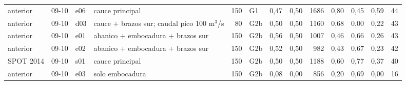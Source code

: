 {\begin{longtable}{lll>{\raggedright\arraybackslash}p{3.3cm}rlrrrrrrr}
anterior & 09-10 & e06 & cauce principal & 150 & G1 & 0{,}47 & 0{,}50 & 1686 & 0{,}80 & 0{,}45 & 0{,}59 & 44\\
anterior & 09-10 & d03 & cauce + brazos sur; caudal pico 100 m$^3$/s & 80 & G2b & 0{,}50 & 0{,}50 & 1160 & 0{,}68 & 0{,}00 & 0{,}22 & 43\\
anterior & 09-10 & e01 & abanico + embocadura + brazos sur & 150 & G2b & 0{,}56 & 0{,}50 & 1007 & 0{,}46 & 0{,}66 & 0{,}26 & 43\\
anterior & 09-10 & e02 & abanico + embocadura + brazos sur & 150 & G2b & 0{,}52 & 0{,}50 & 982 & 0{,}43 & 0{,}67 & 0{,}23 & 42\\
SPOT 2014 & 09-10 & s01 & cauce principal & 150 & G2b & 0{,}50 & 0{,}50 & 1188 & 0{,}60 & 0{,}77 & 0{,}37 & 40\\
anterior & 09-10 & e03 & solo embocadura & 150 & G2b & 0{,}08 & 0{,}00 & 856 & 0{,}20 & 0{,}69 & 0{,}00 & 16\\
\bottomrule\end{longtable}}
